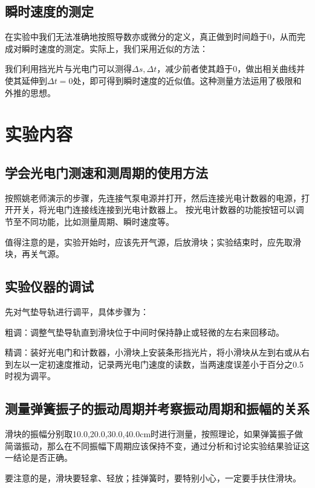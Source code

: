 \documentclass[11pt]{article}
\begin{document}
\subsection{瞬时速度的测定}

在实验中我们无法准确地按照导数亦或微分的定义，真正做到时间趋于0，从而完成对瞬时速度的测定。实际上，我们采用近似的方法：

我们利用挡光片与光电门可以测得$\Delta s,\Delta t$，减少前者使其趋于0，做出相关曲线并使其延伸到$\Delta t=0$处，即可得到瞬时速度的近似值。这种测量方法运用了极限和外推的思想。

\section{实验内容}

\subsection{学会光电门测速和测周期的使用方法}

按照姚老师演示的步骤，先连接气泵电源并打开，然后连接光电计数器的电源，打开开关，将光电门连接线连接到光电计数器上。
按光电计数器的功能按钮可以调节至不同功能，比如测量周期、瞬时速度等。

值得注意的是，实验开始时，应该先开气源，后放滑块；实验结束时，应先取滑块，再关气源。

\subsection{实验仪器的调试}

先对气垫导轨进行调平，具体步骤为：

粗调：调整气垫导轨直到滑块位于中间时保持静止或轻微的左右来回移动。

精调：装好光电门和计数器，小滑块上安装条形挡光片，将小滑块从左到右或从右到左以一定初速度推动，记录两光电门速度的读数，当两速度误差小于百分之0.5时视为调平。

\subsection{测量弹簧振子的振动周期并考察振动周期和振幅的关系}

滑块的振幅分别取10.0,20.0,30.0,40.0cm时进行测量，按照理论，如果弹簧振子做简谐振动，那么在不同振幅下周期应该保持不变，通过分析和讨论实验结果验证这一结论是否正确。

要注意的是，滑块要轻拿、轻放；挂弹簧时，要特别小心，一定要手扶住滑块。
\end{document}
